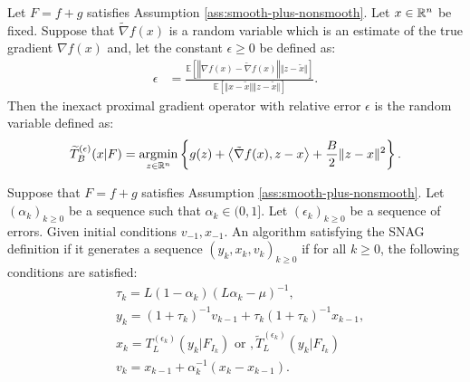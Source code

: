 \documentclass[12pt]{article}
\newcommand{\expect}{\ensuremath{\mathbb E}}
\begin{document}
    \begin{definition}
        Let $F = f + g$ satisfies Assumption \ref{ass:smooth-plus-nonsmooth}. 
        Let $x \in \mathbb R^n$ be fixed. 
        Suppose that $\tilde \nabla f(x)$ is a random variable which is an estimate of the true gradient $\nabla f(x)$ and, let the constant $\epsilon \ge 0$ be defined as: 
        \begin{align*}
            \epsilon &=
            \frac{
            \expect \left[
                \left\Vert \nabla f(x) - \tilde \nabla f(x) \right\Vert \Vert z - \tilde x\Vert
            \right]
            }{\expect \left[
                \Vert x - \tilde x\Vert\Vert z - \tilde x\Vert
            \right]}. 
        \end{align*}
        Then the inexact proximal gradient operator with relative error $\epsilon$ is the random variable defined as: 
        \begin{align*}
            \widetilde T_B^{(\epsilon)}(x| F) = \mathop{\rm argmin}\limits_{z \in \mathbb R^n}\left\lbrace
                g(z) + \left\langle \tilde \nabla f(x), z - x\right\rangle
                + \frac{B}{2}\Vert z - x\Vert^2
            \right\rbrace. 
        \end{align*}
    \end{definition}
    \begin{definition}\label{def:SNAG}
        Suppose that $F = f + g$ satisfies Assumption \ref{ass:smooth-plus-nonsmooth}. 
        Let $(\alpha_k)_{k \ge 0}$ be a sequence such that $\alpha_k \in (0, 1]$. 
        Let $(\epsilon_k)_{k \ge 0}$ be a sequence of errors. 
        Given initial conditions $v_{-1}, x_{- 1}$. 
        An algorithm satisfying the SNAG definition if it generates a sequence $(y_k, x_k, v_k)_{k \ge 0}$ if for all $k \ge 0$, the following conditions are satisfied: 
        \begin{align*}
            & \tau_k = L(1 - \alpha_k)\left(L \alpha_k - \mu\right)^{-1}, \\
            & y_k = (1 + \tau_k)^{-1}v_{k - 1} + \tau_k(1 + \tau_k)^{-1}x_{k - 1}, \\
            & x_k =  T_{L}^{(\epsilon_k)}(y_k | F_{I_k}) \text{ or }, \widetilde T_{L}^{(\epsilon_k)}(y_k | F_{I_k})\\
            & v_k = x_{k - 1} + \alpha_k^{-1}(x_k - x_{k - 1}).
        \end{align*}
    \end{definition}
\end{document}
